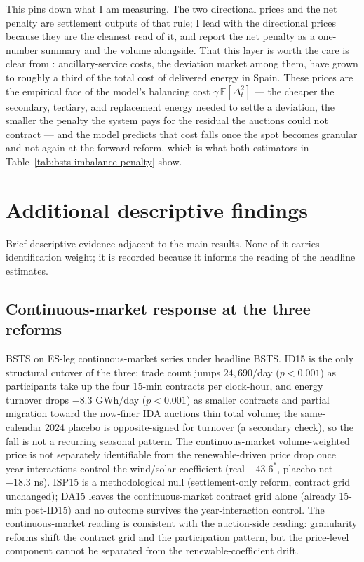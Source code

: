 \documentclass[11pt,a4paper]{article}
\theoremstyle{definition}
\theoremstyle{remark}
\theoremstyle{plain}
\begin{document}
This pins down what I am measuring. The two directional prices and the net penalty are settlement outputs of that rule; I lead with the directional prices because they are the cleanest read of it, and report the net penalty as a one-number summary and the volume alongside. That this layer is worth the care is clear from \citet{brown_reguant_2026}: ancillary-service costs, the deviation market among them, have grown to roughly a third of the total cost of delivered energy in Spain. These prices are the empirical face of the model's balancing cost $\gamma\,\mathbb{E}[\Delta_t^2]$ --- the cheaper the secondary, tertiary, and replacement energy needed to settle a deviation, the smaller the penalty the system pays for the residual the auctions could not contract --- and the model predicts that cost falls once the spot becomes granular and not again at the forward reform, which is what both estimators in Table~\ref{tab:bsts-imbalance-penalty} show.


\section{Additional descriptive findings}\label{app:extra}

Brief descriptive evidence adjacent to the main results. None of it carries identification weight; it is recorded because it informs the reading of the headline estimates.

\subsection{Continuous-market response at the three reforms}\label{app:continuous}

BSTS on ES-leg continuous-market series under headline BSTS. ID15 is the only structural cutover of the three: trade count jumps $24{,}690$/day ($p<0.001$) as participants take up the four 15-min contracts per clock-hour, and energy turnover drops $-8.3$ GWh/day ($p<0.001$) as smaller contracts and partial migration toward the now-finer IDA auctions thin total volume; the same-calendar 2024 placebo is opposite-signed for turnover (a secondary check), so the fall is not a recurring seasonal pattern. The continuous-market volume-weighted price is not separately identifiable from the renewable-driven price drop once year-interactions control the wind/solar coefficient (real $-43.6^{*}$, placebo-net $-18.3$ ns). ISP15 is a methodological null (settlement-only reform, contract grid unchanged); DA15 leaves the continuous-market contract grid alone (already 15-min post-ID15) and no outcome survives the year-interaction control. The continuous-market reading is consistent with the auction-side reading: granularity reforms shift the contract grid and the participation pattern, but the price-level component cannot be separated from the renewable-coefficient drift.
\end{document}
